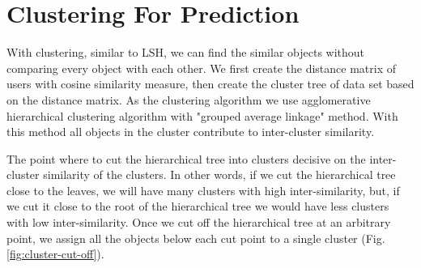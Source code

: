 \documentclass[conference]{IEEEtran}
\begin{document}
\section{Clustering For Prediction}
\label{sec:cluster-prediction}

With clustering, similar to LSH, we can find the similar objects without 
comparing every object with each other. We first create the distance matrix of 
users with cosine similarity measure, then create the cluster tree of data set 
based on the distance matrix. As the clustering algorithm we use agglomerative 
hierarchical clustering algorithm with "grouped average linkage" method. With 
this method all objects in the cluster contribute to inter-cluster similarity.

The point where to cut the hierarchical tree into clusters decisive on the 
inter-cluster similarity of the clusters. In other words, if we cut the 
hierarchical tree close to the leaves, we will have many clusters with high 
inter-similarity, but, if we cut it close to the root of the hierarchical tree 
we would have less clusters with low inter-similarity. Once we cut off the 
hierarchical tree at an arbitrary point, we assign all the objects below each 
cut point to a single cluster (Fig. \ref{fig:cluster-cut-off}). 
\end{document}
